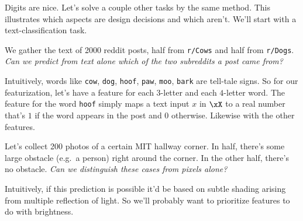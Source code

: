   Digits are nice.  Let's solve a couple other tasks by the same method.  This
  illustrates which aspects are design decisions and which aren't.  We'll start
  with a text-classification task.

  We gather the text of 2000 reddit posts, half from \texttt{r/Cows} and half
  from \texttt{r/Dogs}.  \emph{Can we predict from text alone which of the two
  subreddits a post came from?}

  Intuitively, words like
  \texttt{cow},
  \texttt{dog},
  \texttt{hoof},
  \texttt{paw},
  \texttt{moo},
  \texttt{bark}
  are tell-tale signs.  So for our featurization, let's have a feature for
  each $3$-letter and each $4$-letter word.  The feature for the word
  \texttt{hoof} simply maps a text input $x$ in $\xX$ to a real number that's
  $1$ if the word appears in the post and $0$ otherwise.  Likewise with the
  other features.

  Let's collect 200 photos of a certain MIT hallway corner.  In half, there's
  some large obstacle (e.g.\ a person) right around the corner.  In the other
  half, there's no obstacle.  \emph{Can we distinguish these cases from pixels
  alone?}

  Intuitively, if this prediction is possible it'd be based on subtle shading
  arising from multiple reflection of light.  So we'll probably want to
  prioritize features to do with brightness.  


